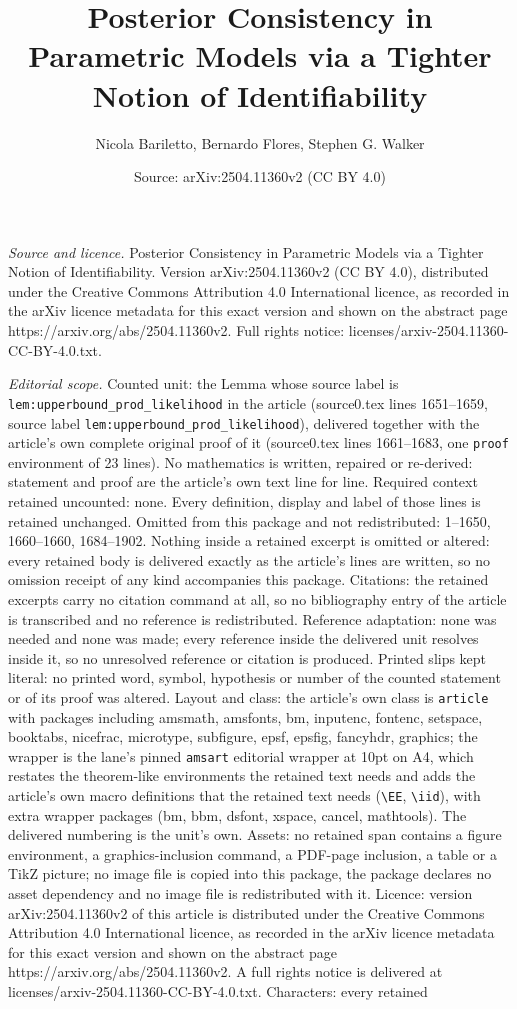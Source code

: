 \documentclass[10pt,a4paper]{amsart}
\title[Posterior Consistency in Parametric Models via a Tighter Not]{Posterior Consistency in Parametric Models via a Tighter Notion of Identifiability}
\author{Nicola Bariletto, Bernardo Flores, Stephen G. Walker}
\date{Source: arXiv:2504.11360v2 (CC BY 4.0)}
\begin{document}
\maketitle

\noindent\emph{Source and licence.} Posterior Consistency in Parametric Models via a Tighter Notion of Identifiability. Version arXiv:2504.11360v2 (CC BY 4.0), distributed under the Creative Commons Attribution 4.0 International licence, as recorded in the arXiv licence metadata for this exact version and shown on the abstract page https://arxiv.org/abs/2504.11360v2. Full rights notice: licenses/arxiv-2504.11360-CC-BY-4.0.txt.\par\smallskip

\noindent\textit{Editorial scope.} Counted unit: the Lemma whose source label is \texttt{lem:upperbound\_prod\_likelihood} in the article (source0.tex lines 1651--1659, source label \texttt{lem:upperbound\_prod\_likelihood}), delivered together with the article's own complete original proof of it (source0.tex lines 1661--1683, one \texttt{proof} environment of 23 lines). No mathematics is written, repaired or re-derived: statement and proof are the article's own text line for line. Required context retained uncounted: none. Every definition, display and label of those lines is retained unchanged. Omitted from this package and not redistributed: 1--1650, 1660--1660, 1684--1902. Nothing inside a retained excerpt is omitted or altered: every retained body is delivered exactly as the article's lines are written, so no omission receipt of any kind accompanies this package. Citations: the retained excerpts carry no citation command at all, so no bibliography entry of the article is transcribed and no reference is redistributed. Reference adaptation: none was needed and none was made; every reference inside the delivered unit resolves inside it, so no unresolved reference or citation is produced. Printed slips kept literal: no printed word, symbol, hypothesis or number of the counted statement or of its proof was altered. Layout and class: the article's own class is \texttt{article} with packages including amsmath, amsfonts, bm, inputenc, fontenc, setspace, booktabs, nicefrac, microtype, subfigure, epsf, epsfig, fancyhdr, graphics; the wrapper is the lane's pinned \texttt{amsart} editorial wrapper at 10pt on A4, which restates the theorem-like environments the retained text needs and adds the article's own macro definitions that the retained text needs (\texttt{\textbackslash EE}, \texttt{\textbackslash iid}), with extra wrapper packages (bm, bbm, dsfont, xspace, cancel, mathtools). The delivered numbering is the unit's own. Assets: no retained span contains a figure environment, a graphics-inclusion command, a PDF-page inclusion, a table or a TikZ picture; no image file is copied into this package, the package declares no asset dependency and no image file is redistributed with it. Licence: version arXiv:2504.11360v2 of this article is distributed under the Creative Commons Attribution 4.0 International licence, as recorded in the arXiv licence metadata for this exact version and shown on the abstract page https://arxiv.org/abs/2504.11360v2. A full rights notice is delivered at licenses/arxiv-2504.11360-CC-BY-4.0.txt. Characters: every retained 
\end{document}
